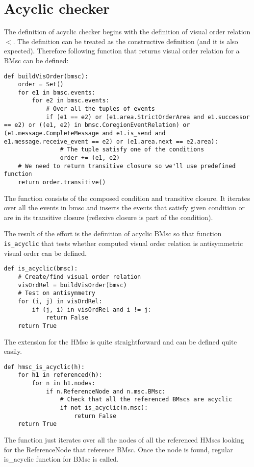 \documentclass[11pt,oneside]{fithesis2}
\newcommand{\T}[1]{\texttt{#1}}
\begin{document}
\section{Acyclic checker}
The definition of acyclic checker begins with the definition of visual order relation $<$. The definition can be treated as the constructive definition (and it is also expected). Therefore following function that returns visual order relation for a BMsc can be defined:
\begin{lstlisting}
def buildVisOrder(bmsc):
    order = Set()
    for e1 in bmsc.events:
        for e2 in bmsc.events:
            # Over all the tuples of events
            if (e1 == e2) or (e1.area.StrictOrderArea and e1.successor == e2) or ((e1, e2) in bmsc.CoregionEventRelation) or (e1.message.CompleteMessage and e1.is_send and e1.message.receive_event == e2) or (e1.area.next == e2.area):
                # The tuple satisfy one of the conditions
                order += (e1, e2)
    # We need to return transitive closure so we'll use predefined function
    return order.transitive()
\end{lstlisting}
The function consists of the composed condition and transitive closure. It iterates over all the events in bmsc and inserts the events that satisfy given condition or are in its transitive closure (reflexive closure is part of the condition).

The result of the effort is the definition of acyclic BMsc so that function \T{is\_acyclic} that tests whether computed visual order relation is antisymmetric visual order can be defined. 
\begin{lstlisting}
def is_acyclic(bmsc):
    # Create/find visual order relation
    visOrdRel = buildVisOrder(bmsc)
    # Test on antisymmetry
    for (i, j) in visOrdRel:
        if (j, i) in visOrdRel and i != j:
            return False
    return True
\end{lstlisting}

The extension for the HMsc is quite straightforward and can be defined quite easily.
\begin{lstlisting}
def hmsc_is_acyclic(h):
    for h1 in referenced(h):
        for n in h1.nodes:
            if n.ReferenceNode and n.msc.BMsc:
                # Check that all the referenced BMscs are acyclic
                if not is_acyclic(n.msc):
                    return False
    return True
\end{lstlisting}

The function just iterates over all the nodes of all the referenced HMscs looking for the ReferenceNode that reference BMsc. Once the node is found, regular is\_acyclic function for BMsc is called.
\end{document}

